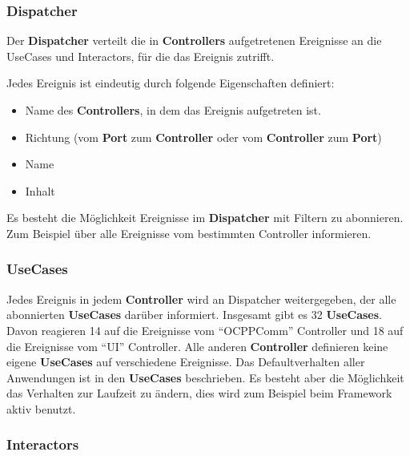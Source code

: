 \subsubsection{Dispatcher}
Der \textbf{Dispatcher} verteilt die in \textbf{Controllers} aufgetretenen Ereignisse an die UseCases und Interactors, für die das Ereignis zutrifft.

Jedes Ereignis ist eindeutig durch folgende Eigenschaften definiert:
\begin{itemize}
    \item Name des \textbf{Controllers}, in dem das Ereignis aufgetreten ist.
    \item Richtung (vom \textbf{Port} zum \textbf{Controller} oder vom \textbf{Controller} zum \textbf{Port})
    \item Name
    \item Inhalt
\end{itemize}

Es besteht die Möglichkeit Ereignisse im \textbf{Dispatcher} mit Filtern zu abonnieren. 
Zum Beispiel über alle Ereignisse vom bestimmten Controller informieren.

\subsubsection{UseCases}

Jedes Ereignis in jedem \textbf{Controller} wird an Dispatcher weitergegeben, der alle abonnierten \textbf{UseCases} darüber informiert.
Insgesamt gibt es 32 \textbf{UseCases}. 
Davon reagieren 14 auf die Ereignisse vom ``OCPPComm'' Controller und 18 auf die Ereignisse vom ``UI'' Controller. 
Alle anderen \textbf{Controller} definieren keine eigene \textbf{UseCases} auf verschiedene Ereignisse.
Das Defaultverhalten aller Anwendungen ist in den \textbf{UseCases} beschrieben. Es besteht aber die Möglichkeit das Verhalten zur Laufzeit zu ändern, 
dies wird zum Beispiel beim Framework aktiv benutzt.

\subsubsection{Interactors}

